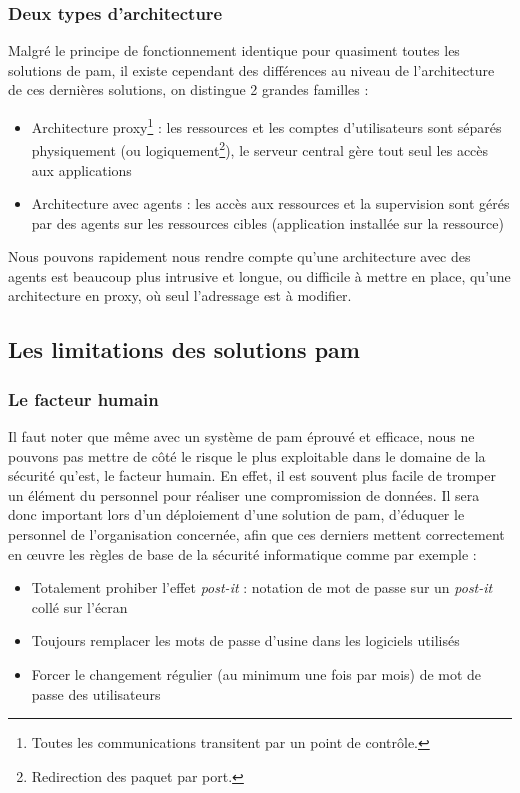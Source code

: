 \subsubsection{Deux types d'architecture}
Malgré le principe de fonctionnement identique pour quasiment toutes les solutions de \gls{pam}, il existe cependant des différences au niveau de l'architecture de ces dernières solutions, on distingue 2 grandes familles :
\begin{itemize}
	\item Architecture proxy\footnote{Toutes les communications transitent par un point de contrôle.} : les ressources et les comptes d'utilisateurs sont séparés physiquement (ou logiquement\footnote{Redirection des paquet  par port.}), le serveur central gère tout seul les accès aux applications
	\item Architecture avec agents : les accès aux ressources et la supervision sont gérés par des agents sur les ressources cibles (application installée sur la ressource)
\end{itemize}
Nous pouvons rapidement nous rendre compte qu'une architecture avec des agents est beaucoup plus intrusive et longue, ou difficile à mettre en place, qu'une architecture en proxy, où seul l'adressage est à modifier.

\subsection{Les limitations des solutions \gls{pam}}

\subsubsection{Le facteur humain} Il faut noter que même avec un système de \gls{pam} éprouvé et efficace, nous ne pouvons pas mettre de côté le risque le plus exploitable dans le domaine de la sécurité qu'est, le facteur humain. En effet, il est souvent plus facile de tromper un élément du personnel pour réaliser une compromission de données. Il sera donc important lors d'un déploiement d'une solution de \gls{pam}, d'éduquer le personnel de l'organisation concernée, afin que ces derniers mettent correctement en œuvre les règles de base de la sécurité informatique comme par exemple :
\begin{itemize}
	\item Totalement prohiber \og l'effet \textit{post-it} \fg{} : notation de mot de passe sur un \textit{post-it} collé sur l'écran
	\item Toujours remplacer les mots de passe d'usine dans les logiciels utilisés
	\item Forcer le changement régulier (au minimum une fois par mois) de mot de passe des utilisateurs
\end{itemize}

